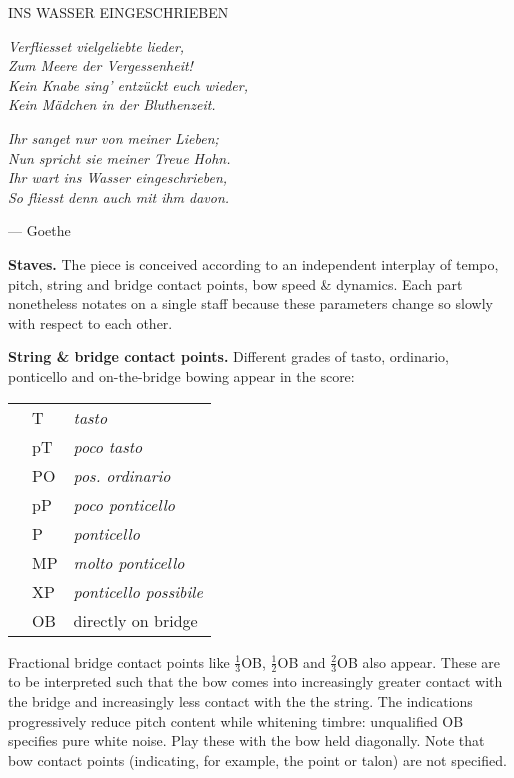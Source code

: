 \begin{center}
\huge INS WASSER EINGESCHRIEBEN
\end{center}

\begin{center}
\textit{Verfliesset vielgeliebte lieder,\\
Zum Meere der Vergessenheit!\\
Kein Knabe sing' entzückt euch wieder,\\
Kein Mädchen in der Bluthenzeit.}

\textit{Ihr sanget nur von meiner Lieben;\\
Nun spricht sie meiner Treue Hohn.\\
Ihr wart ins Wasser eingeschrieben,\\
So fliesst denn auch mit ihm davon.}

\hspace {4cm} --- Goethe
\end{center}

\textbf{Staves.} The piece is conceived according to an independent interplay
of tempo, pitch, string and bridge contact points, bow speed \& dynamics. Each
part nonetheless notates on a single staff because these parameters change so
slowly with respect to each other.

\textbf{String \& bridge contact points.} Different grades of tasto, ordinario,
ponticello and on-the-bridge bowing appear in the score:

\begin{tabular}{l l l}
\phantom{M} & T & \textit{tasto} \\
            & pT & \textit{poco tasto} \\
            & PO & \textit{pos. ordinario} \\
            & pP & \textit{poco ponticello} \\
            & P & \textit{ponticello} \\
            & MP & \textit{molto ponticello} \\
            & XP & \textit{ponticello possibile} \\
            & OB & directly on bridge \\
\end{tabular}

Fractional bridge contact points like $\frac{1}{3}$OB, $\frac{1}{2}$OB and
$\frac{2}{3}$OB also appear. These are to be interpreted such that the bow
comes into increasingly greater contact with the bridge and increasingly less
contact with the the string. The indications progressively reduce pitch content
while whitening timbre: unqualified OB specifies pure white noise. Play these
with the bow held diagonally. Note that bow contact points (indicating, for
example, the point or talon) are not specified.
 
